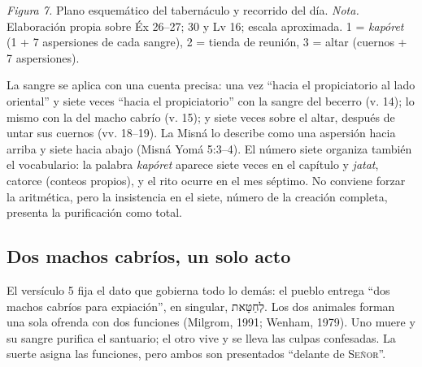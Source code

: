 \documentclass[11pt,letterpaper]{article}
\newcommand{\heb}[1]{\mbox{\foreignlanguage{hebrew}{#1}}}
\newcommand{\SENOR}{\textsc{Señor}}
\begin{document}
\begin{center}
{}\par
{\footnotesize\color{sepia}\textit{Figura 7.} Plano esquemático del tabernáculo y recorrido del día. \textit{Nota.} Elaboración propia sobre Éx 26--27; 30 y Lv 16; escala aproximada. 1 = \emph{kapóret} (1 + 7 aspersiones de cada sangre), 2 = tienda de reunión, 3 = altar (cuernos + 7 aspersiones).}
\end{center}

La sangre se aplica con una cuenta precisa: una vez ``hacia el propiciatorio al lado oriental'' y siete veces ``hacia el propiciatorio'' con la sangre del becerro (v. 14); lo mismo con la del macho cabrío (v. 15); y siete veces sobre el altar, después de untar sus cuernos (vv. 18--19). La Misná lo describe como una aspersión hacia arriba y siete hacia abajo (Misná Yomá 5:3--4). El número siete organiza también el vocabulario: la palabra \emph{kapóret} aparece siete veces en el capítulo y \emph{jatat}, catorce (conteos propios), y el rito ocurre en el mes séptimo. No conviene forzar la aritmética, pero la insistencia en el siete, número de la creación completa, presenta la purificación como total.

\subsection{Dos machos cabríos, un solo acto}
El versículo 5 fija el dato que gobierna todo lo demás: el pueblo entrega ``dos machos cabríos para expiación'', en singular, \heb{לְחַטָּאת}. Los dos animales forman una sola ofrenda con dos funciones (Milgrom, 1991; Wenham, 1979). Uno muere y su sangre purifica el santuario; el otro vive y se lleva las culpas confesadas. La suerte asigna las funciones, pero ambos son presentados ``delante de \SENOR''.
\end{document}
